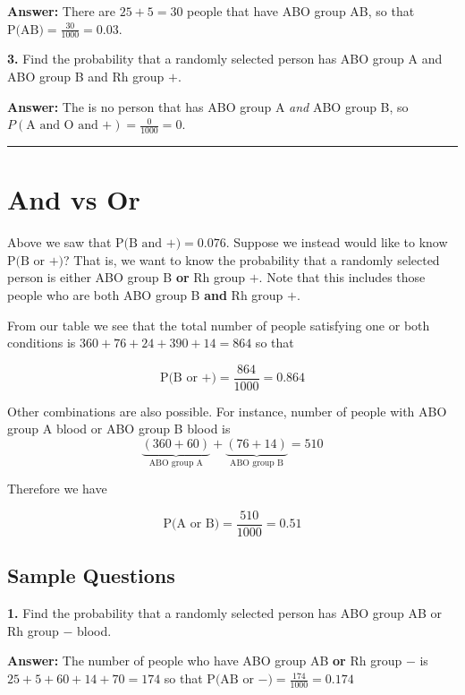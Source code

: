 \documentclass[
]{book}
\begin{document}
\textbf{Answer:} There are \(25 + 5 = 30\) people that have ABO group AB, so that
\(\mbox{P(AB)} = \frac{30}{1000} = 0.03\).

\textbf{3.} Find the probability that a randomly selected person has ABO group A and
ABO group B and Rh group \(+\).

\textbf{Answer:} The is no person that has ABO group A \emph{and} ABO group B, so
\(P(\text{A and O and +}) = \frac{0}{1000} = 0\).

\begin{center}\rule{0.5\linewidth}{0.5pt}\end{center}

\hypertarget{and-vs-or}{%
\section{And vs Or}\label{and-vs-or}}

Above we saw that \(\text{P(B and }+) = 0.076\). Suppose we instead would like
to know \(\text{P(B or }+)\)?
That is, we want to know the probability that a randomly selected person
is either ABO group B \textbf{or} Rh group \(+\).
Note that this includes those people who are both ABO group B \textbf{and} Rh group \(+\).

From our table we see that the total number of people satisfying one or both
conditions is \(360 + 76 + 24 + 390 + 14 = 864\) so that

\[
\text{P(B or +)} = \frac{864}{1000} = 0.864
\]

Other combinations are also possible.
For instance, number of people with ABO group A blood or ABO group B blood
is
\[
\underbrace{(360 + 60)}_\text{ABO group A} + \underbrace{(76 + 14)}_\text{ABO group B} = 510
\]

Therefore we have

\[
\mbox{P(A or B)} = \frac{510}{1000} = 0.51
\]

\hypertarget{sample-questions-3}{%
\subsection{Sample Questions}\label{sample-questions-3}}

\textbf{1.} Find the probability that a randomly selected person has ABO group AB
or Rh group \(-\) blood.

\textbf{Answer:} The number of people who have ABO group AB \textbf{or} Rh group \(-\) is
\(25 + 5 + 60 + 14 + 70 = 174\) so that
\(\text{P(AB or }-) = \frac{174}{1000} = 0.174\)
\end{document}
